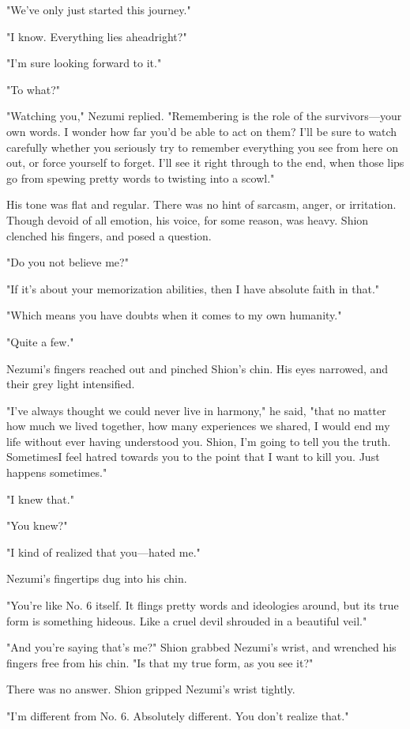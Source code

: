 "We've only just started this journey."

"I know. Everything lies ahead\el right?"

"I'm sure looking forward to it."

"To what?"

"Watching you," Nezumi replied. "Remembering is the role of the
survivors---your own words. I wonder how far you'd be able to act on them?
I'll be sure to watch carefully whether you seriously try to remember
everything you see from here on out, or force yourself to forget. I'll
see it right through to the end, when those lips go from spewing pretty
words to twisting into a scowl."

His tone was flat and regular. There was no hint of sarcasm, anger, or
irritation. Though devoid of all emotion, his voice, for some reason,
was heavy. Shion clenched his fingers, and posed a question.

"Do you not believe me?"

"If it's about your memorization abilities, then I have absolute faith
in that."

"Which means you have doubts when it comes to my own humanity."

"Quite a few."

Nezumi's fingers reached out and pinched Shion's chin. His eyes
narrowed, and their grey light intensified.

"I've always thought we could never live in harmony," he said, "that no
matter how much we lived together, how many experiences we shared, I
would end my life without ever having understood you. Shion, I'm going
to tell you the truth. Sometimes\el I feel hatred towards you to the
point that I want to kill you. Just happens sometimes."

"I knew that."

"You knew?"

"I kind of realized that you---hated me."

Nezumi's fingertips dug into his chin.

"You're like No. 6 itself. It flings pretty words and ideologies around,
but its true form is something hideous. Like a cruel devil shrouded in a
beautiful veil."

"And you're saying that's me?" Shion grabbed Nezumi's wrist, and
wrenched his fingers free from his chin. "Is that my true form, as you
see it?"

There was no answer. Shion gripped Nezumi's wrist tightly.

"I'm different from No. 6. Absolutely different. You don't realize
that."

